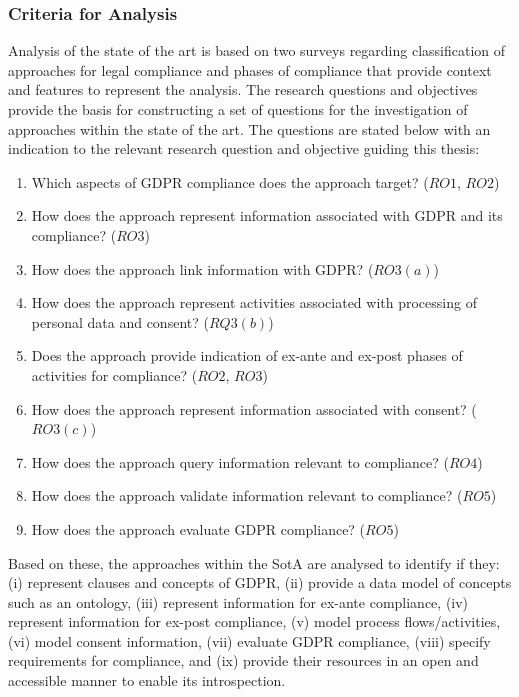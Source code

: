 \subsubsection{Criteria for Analysis}
Analysis of the state of the art is based on two surveys regarding
classification of approaches for legal compliance \cite{otto_addressing_2007} and phases of compliance \cite{fellmann_state---art_2014} that provide context and features to represent the analysis.
The research questions and objectives provide the basis for constructing a set of questions for the investigation of approaches within the state of the art.
The questions are stated below with an indication to the relevant research question and objective guiding this thesis:
\begin{enumerate}
    \item Which aspects of GDPR compliance does the approach target? ($RO1$, $RO2$)
    \item How does the approach represent information associated with GDPR and its compliance? ($RO3$)
    \item How does the approach link information with GDPR? ($RO3(a)$)
    \item How does the approach represent activities associated with processing of personal data and consent? ($RQ3(b)$)
    \item Does the approach provide indication of ex-ante and ex-post phases of activities for compliance? ($RO2$, $RO3$)
    \item How does the approach represent information associated with consent? ($RO3(c)$)
    \item How does the approach query information relevant to compliance? ($RO4$)
    \item How does the approach validate information relevant to compliance? ($RO5$)
    \item How does the approach evaluate GDPR compliance? ($RO5$)
\end{enumerate}

Based on these, the approaches within the SotA are analysed to identify if they: (i) represent clauses and concepts of GDPR, (ii) provide a data model of concepts such as an ontology, (iii) represent information for ex-ante compliance, (iv) represent information for ex-post compliance, (v) model process flows/activities, (vi) model consent information, (vii) evaluate GDPR compliance, (viii) specify requirements for compliance, and (ix) provide their resources in an open and accessible manner to enable its introspection.

